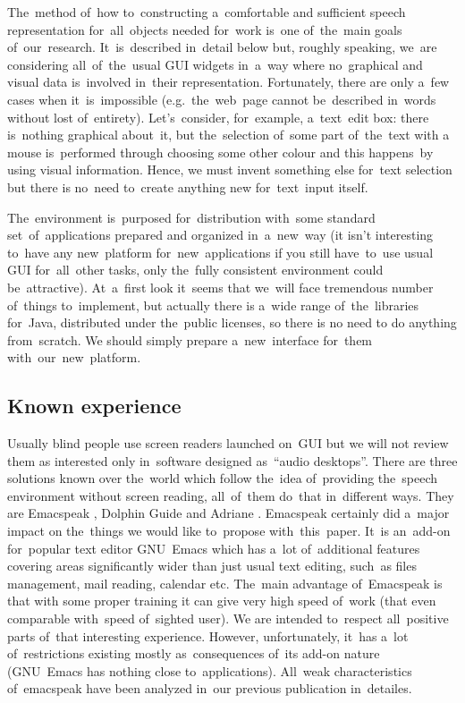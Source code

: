 \documentclass{acm_proc_article-sp}
\begin{document}
The~method of~how to~constructing a~comfortable and sufficient speech representation for~all~objects needed for~work
is~one of~the~main goals of~our~research.
It~is~described in~detail below but, roughly speaking,
we~are considering all~of~the~usual GUI widgets  in~a~way where no~graphical and visual data is~involved in~their representation.
Fortunately, there are only a~few cases when it~is~impossible (e.g.~the~web~page cannot be~described in~words without lost of~entirety).
Let's~consider, for~example, a~text~edit box: 
there is~nothing graphical about~it, 
but the~selection of~some part of~the~text with a mouse is~performed through choosing some other colour 
and this happens~by using visual information.
Hence, we must invent something else for~text selection but there is no~need to~create anything new for~text~input itself.

The~environment is~purposed for~distribution with~some standard set~of~applications 
prepared and organized in~a~new~way
(it isn't interesting to~have any new~platform for~new~applications
if you still have~to~use usual GUI for~all~other tasks, 
only the~fully consistent environment could be~attractive).
At~a~first look it~seems that we~will face tremendous number of~things to~implement, 
but actually there is a~wide range of~the~libraries for~Java, distributed under the~public licenses,
so there is no need to do anything from~scratch.
We should simply prepare a~new~interface for~them with~our~new~platform.

\subsection{Known experience}

Usually blind people use screen readers launched on~GUI 
but we will not review them  as interested only   in~software designed as~``audio desktops''.
There are three solutions  known over the~world 
which follow the~idea of~providing the~speech environment without screen reading,
all~of~them do~that in~different ways.
They are Emacspeak \cite{emacspeak}, 
Dolphin Guide \cite{dolphineguide} and 
Adriane \cite{adriane}. 
Emacspeak certainly did a~major impact on the~things we would like to~propose with~this~paper.
It~is an~add-on for~popular text editor GNU~Emacs \cite{emacs}
which has a~lot of~additional features covering areas significantly wider than just usual text editing, 
such~as files management, mail reading, calendar etc. 
The~main advantage of~Emacspeak is that with some proper training 
it can give very high speed of~work (that even comparable with~speed of~sighted user).
We are intended to~respect all~positive parts of~that interesting experience.
However, unfortunately, it~has a~lot of~restrictions 
existing mostly as~consequences of~its add-on nature 
(GNU~Emacs has nothing close to~applications). 
All~weak characteristics  of~emacspeak have been analyzed  in~our previous publication \cite{luwrain1} in~detailes.
\end{document}
